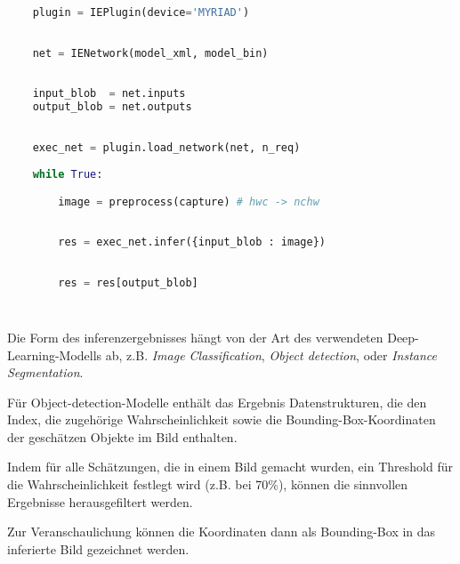 \vspace{1cm}
\begin{minipage}{0.30\textwidth}
    \centering
    
    \label{fig:inger_engine_workflow}
\end{minipage}
\begin{minipage}{0.70\textwidth}

\begin{lstlisting}[language=Python]

    plugin = IEPlugin(device='MYRIAD')

        
    net = IENetwork(model_xml, model_bin)
        
    
    input_blob  = net.inputs
    output_blob = net.outputs
        

    exec_net = plugin.load_network(net, n_req)
        
    while True:

        image = preprocess(capture) # hwc -> nchw
        
        
        res = exec_net.infer({input_blob : image})
        

        res = res[output_blob]
        
        
\end{lstlisting}
\vspace{1.5cm}
\end{minipage}
\vspace{1cm}


Die Form des \Gls{inferenz}ergebnisses hängt von der 
Art des verwendeten Deep-Learning-Modells ab, z.B.
\textit{Image Classification}, \textit{Object detection},
oder \textit{Instance
Segmentation}.

Für Object-detection-Modelle enthält das Ergebnis
 Datenstrukturen, die den Index, 
 die zugehörige Wahrscheinlichkeit sowie die 
 Bounding-Box-Koordinaten der geschätzen Objekte im Bild enthalten.

Indem für alle Schätzungen, die in einem Bild gemacht wurden, 
ein Threshold für die Wahrscheinlichkeit festlegt wird (z.B. bei 70\%),
können die sinnvollen Ergebnisse herausgefiltert werden.

Zur Veranschaulichung können die Koordinaten dann 
als Bounding-Box in das inferierte Bild gezeichnet werden.
